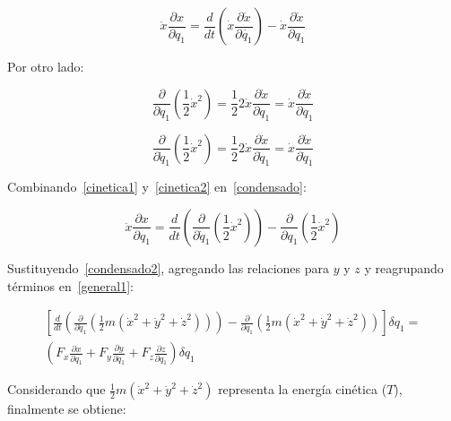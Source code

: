 \begin{equation}
    \ddot{x}\frac{\partial x}{\partial q_1}=
    \frac{d}{dt}\left(\dot{x}\frac{\partial \dot{x}}{\partial \dot{q_1}}\right)-
    \dot{x}\frac{\partial \dot{x}}{\partial q_1}
    \label{condensado}
\end{equation}

Por otro lado:

\begin{equation}
    \frac{\partial}{\partial q_1}\left(\frac{1}{2}\dot{x}^2\right)=
    \frac{1}{2}2\dot{x}\frac{\partial\dot{x}}{\partial q_1}=
    \dot{x}\frac{\partial\dot{x}}{\partial q_1}
    \label{cinetica1}
\end{equation}

\begin{equation}
    \frac{\partial}{\partial \dot{q}_1}\left(\frac{1}{2}\dot{x}^2\right)=
    \frac{1}{2}2\dot{x}\frac{\partial\dot{x}}{\partial \dot{q}_1}=
    \dot{x}\frac{\partial\dot{x}}{\partial \dot{q}_1}
    \label{cinetica2}
\end{equation}

Combinando~\ref{cinetica1} y~\ref{cinetica2} en~\ref{condensado}:

\begin{equation}
    \ddot{x}\frac{\partial x}{\partial q_1}=
    \frac{d}{dt}\left(\frac{\partial}{\partial \dot{q}_1}
        \left(\frac{1}{2}\dot{x}^2\right)
    \right)-
    \frac{\partial}{\partial q_1}\left(\frac{1}{2}\dot{x}^2\right)
    \label{condensado2}
\end{equation}

Sustituyendo~\ref{condensado2}, agregando las relaciones para $y$ y $z$ y
reagrupando términos en~\ref{general1}:

\begin{equation*}
\begin{split}
    \left[
        \frac{d}{dt}\left(
            \frac{\partial}{\partial\dot{q}_1}\left(
                \frac{1}{2}m(\dot{x}^2+\dot{y}^2+\dot{z}^2)
            \right)
        \right)-
        \frac{\partial}{\partial q_1}\left(
            \frac{1}{2}m(\dot{x}^2+\dot{y}^2+\dot{z}^2)
        \right)
    \right]\delta q_1=\\
    \left(
        F_x\frac{\partial x}{\partial q_1}+
        F_y\frac{\partial y}{\partial q_1}+
        F_z\frac{\partial z}{\partial q_1}
    \right)\delta q_1
\end{split}
\end{equation*}

Considerando que $\frac{1}{2}m(\dot{x}^2+\dot{y}^2+\dot{z}^2)$ representa la
energía cinética ($T$), finalmente se obtiene:


